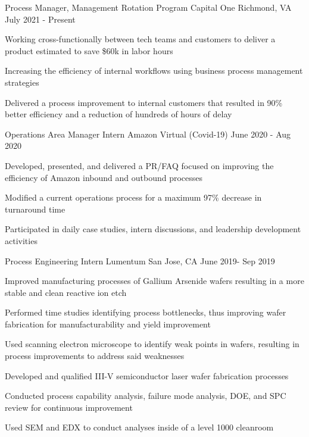 

\begin{cventries}

\cventry
  {Process Manager, Management Rotation Program \textcolor{lightgray}{}}
  {Capital One}
  {Richmond, VA}
  {July 2021 -  Present}
  {
  \begin{cvitems}
    \item {Working cross-functionally between tech teams and customers to deliver a product estimated to save \$60k in labor hours}
    \item {Increasing the efficiency of internal workflows using business process management strategies}
    \item {Delivered a process improvement to internal customers that resulted in 90\% better efficiency and a reduction of hundreds of hours of delay}
  \end{cvitems}
  }


 \cventry
  {Operations Area Manager Intern \textcolor{lightgray}{}}
  {Amazon}
  {Virtual (Covid-19)}
  {June 2020 - Aug 2020}
  {
  \begin{cvitems}
    \item {Developed, presented, and delivered a PR/FAQ focused on improving the efficiency of Amazon inbound and outbound processes}
    \item {Modified a current operations process for a maximum 97\% decrease in turnaround time}
    \item {Participated in daily case studies, intern discussions, and leadership development activities}
  \end{cvitems}
  }

  \cventry
  {Process Engineering Intern \textcolor{lightgray}{}}
  {Lumentum}
  {San Jose, CA}
  {June 2019- Sep 2019}
  {
  \begin{cvitems}
    \item {Improved manufacturing processes of Gallium Arsenide wafers resulting in a more stable and clean reactive ion etch}
    \item {Performed time studies identifying process bottlenecks, thus improving wafer fabrication for manufacturability and yield improvement}
    \item{Used scanning electron microscope to identify weak points in wafers, resulting in process improvements to address said weaknesses}
    \item{Developed and qualified III-V semiconductor laser wafer fabrication processes}
    \item{Conducted process capability analysis, failure mode analysis, DOE, and SPC review for continuous improvement}
    \item{Used SEM and EDX to conduct analyses inside of a level 1000 cleanroom}
  \end{cvitems}
  }


\end{cventries}
